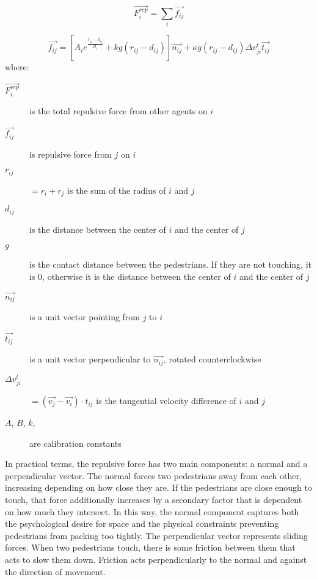 \documentclass[twoside, 11pt]{article}
\begin{document}
\begin{equation}
  \vec{F_i^{rep}} = \sum_i\vec{f_{ij}}
  \label{eq:pedestrian_repulsion_total}
\end{equation}

\begin{equation}
  \vec{f_{ij}} = [A_ie^{\frac{r_{ij} - d_{ij}}{B_i}} + kg(r_{ij}-d_{ij})]\vec{n_{ij}} + \kappa g (r_{ij} - d_{ij})\Delta v_{ji}^t \vec{t_{ij}}
  \label{eq:pedestrian_repulsion}
\end{equation}
where:
\begin{description}
  \item[$\vec{F_i^{rep}}$] is the total repulsive force from other agents on $i$
  \item[$\vec{f_{ij}}$] is repulsive force from $j$ on $i$
  
  \item[$r_{ij}$] $= r_i + r_j$ is the sum of the radius of $i$ and $j$
  \item[$d_{ij}$] is the distance between the center of $i$ and the center of $j$
  \item[$g$] is the contact distance between the pedestrians. If they are not touching, it is $0$, otherwise it is the distance between the center of $i$ and the center of $j$
  \item[$\vec{n_{ij}}$] is a unit vector pointing from $j$ to $i$
  \item[$\vec{t_{ij}}$] is a unit vector perpendicular to $\vec{n_{ij}}$, rotated counterclockwise
  \item[$\Delta v_{ji}^t$] $= (\vec{v_j} - \vec{v_i}) \cdot t_{ij}$ is the tangential velocity difference of $i$ and $j$
  \item[$A$, $B$, $k$, \kappa] are calibration constants
\end{description}

In practical terms, the repulsive force has two main components: a normal and a perpendicular vector. The normal forces two pedestrians away from each other, increasing depending on how close they are. If the pedestrians are close enough to touch, that force additionally increases by a secondary factor that is dependent on how much they intersect. In this way, the normal component captures both the psychological desire for space and the physical constraints preventing pedestrians from packing too tightly. The perpendicular vector represents sliding forces. When two pedestrians touch, there is some friction between them that acts to slow them down. Friction acts perpendicularly to the normal and against the direction of movement.
\end{document}
